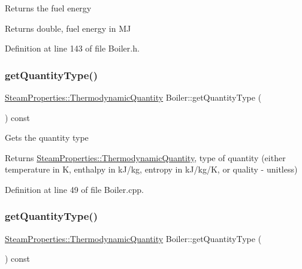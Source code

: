 Returns the fuel energy \begin{DoxyReturn}{Returns}
double, fuel energy in MJ 
\end{DoxyReturn}


Definition at line 143 of file Boiler.\+h.

\mbox{\label{class_boiler_a26a71f789c9f9e05bd43a1ca0219f920}} 
\subsubsection{\texorpdfstring{get\+Quantity\+Type()}{getQuantityType()}\hspace{0.1cm}{\footnotesize\ttfamily [1/3]}}
{\footnotesize\ttfamily \hyperlink{class_steam_properties_ae0294bedf7d178c2d8fb6aed0f62fbff}{Steam\+Properties\+::\+Thermodynamic\+Quantity} Boiler\+::get\+Quantity\+Type (\begin{DoxyParamCaption}{ }\end{DoxyParamCaption}) const}

Gets the quantity type \begin{DoxyReturn}{Returns}
\hyperlink{class_steam_properties_ae0294bedf7d178c2d8fb6aed0f62fbff}{Steam\+Properties\+::\+Thermodynamic\+Quantity}, type of quantity (either temperature in K, enthalpy in k\+J/kg, entropy in k\+J/kg/K, or quality -\/ unitless) 
\end{DoxyReturn}


Definition at line 49 of file Boiler.\+cpp.

\mbox{\label{class_boiler_a26a71f789c9f9e05bd43a1ca0219f920}} 
\subsubsection{\texorpdfstring{get\+Quantity\+Type()}{getQuantityType()}\hspace{0.1cm}{\footnotesize\ttfamily [2/3]}}
{\footnotesize\ttfamily \hyperlink{class_steam_properties_ae0294bedf7d178c2d8fb6aed0f62fbff}{Steam\+Properties\+::\+Thermodynamic\+Quantity} Boiler\+::get\+Quantity\+Type (\begin{DoxyParamCaption}{ }\end{DoxyParamCaption}) const}

